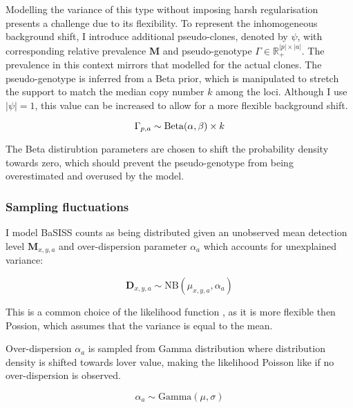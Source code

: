 Modelling the variance of this type without imposing harsh regularisation presents a challenge due to its flexibility. To represent the inhomogeneous background shift, I introduce additional pseudo-clones, denoted by $\psi$, with corresponding relative prevalence $\mathbf{M}$ and pseudo-genotype $\Gamma \in \mathbb{R}^{|p|\times|a|}_{+}$. The prevalence in this context mirrors that modelled for the actual clones. The pseudo-genotype is inferred from a Beta prior, which is manipulated to stretch the support to match the median copy number $k$ among the loci. Although I use $|\psi| = 1$, this value can be increased to allow for a more flexible background shift.

\begin{equation} 
    {\Gamma}_{p,a} \sim \text{Beta}(\alpha, \beta) \times k \\
\end{equation}

The Beta distirubtion parameters are chosen to shift the probability density towards zero, which should prevent the pseudo-genotype from being overestimated and overused by the model.

\subsubsection*{Sampling fluctuations}

I model BaSISS counts as being  distributed given an unobserved mean detection level $\mathbf{M}_{x,y,a}$ and over-dispersion parameter ${\alpha}_a$ which accounts for unexplained variance:

\begin{equation} 
\mathbf{D}_{x,y,a} \sim \text{NB}(\mu_{x,y,a}, \alpha_a)
\end{equation}

This is a common choice of the likelihood function \parencite{Kleshchevnikov2022-ch, Townes2023-uj}, as it is more flexible then Possion, which assumes that the variance is equal to the mean.

Over-dispersion $\alpha_a$ is sampled from Gamma distribution where distribution density is shifted towards lover value, making the likelihood Poisson like if no over-dispersion is observed.

\begin{equation}
    {\alpha}_a \sim \mathrm{Gamma}(\mu, \sigma)
\end{equation} 

